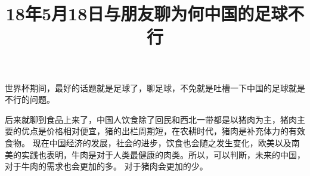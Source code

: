 \documentclass{article}
\title{18年5月18日与朋友聊为何中国的足球不行}
\begin{document}
	世界杯期间，最好的话题就是足球了，聊足球，不免就是吐槽一下中国的足球就是不行的问题。\par
	后来就聊到食品上来了，中国人饮食除了回民和西北一带都是以猪肉为主，猪肉主要的优点是价格相对便宜，猪的出栏周期短，在农耕时代，猪肉是补充体力的有效食物。
	现在中国经济的发展，社会的进步，饮食也会随之发生变化，欧美以及南美的实践也表明，牛肉是对于人类最健康的肉类。所以，可以判断，未来的中国，对于牛肉的需求也会更加的多。
	对于猪肉会更加的少。
\end{document}
